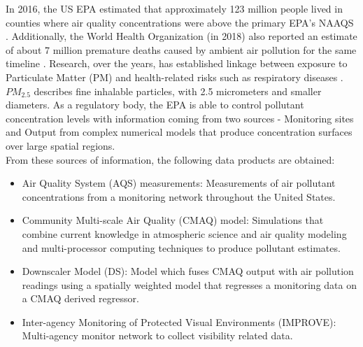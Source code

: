 \documentclass[10pt]{article}
\theoremstyle{plain}
\theoremstyle{definition}
\theoremstyle{remark}
\begin{document}
\justify
In 2016, the US EPA estimated that approximately 123 million people lived in 
counties where air quality concentrations were above the primary EPA's NAAQS \cite{EPAAir}.  Additionally, the World Health Organization (in 2018) also reported an estimate of about 7 million premature deaths caused by ambient air pollution for the same timeline \cite{WhoAir}.  Research, over the years, has established linkage between exposure to Particulate Matter (PM) and health-related risks such as respiratory diseases \cite{schwartz1996air, braga2001lag, dominici2006fine}.  $PM_{2.5}$ describes fine inhalable particles, with 2.5 micrometers and smaller diameters.  As a regulatory body, the EPA is able to control pollutant concentration levels with information coming from two sources - Monitoring sites and Output from complex numerical models that produce concentration surfaces over large spatial regions.\\
\vspace{-1.5em}
\justify
From these sources of information, the following data products are obtained:
\begin{itemize}
	\vspace{-0.5em}
	\item Air Quality System (AQS) measurements: Measurements of air pollutant concentrations from a monitoring network throughout the United States.
	\vspace{-0.5em}
	\item Community Multi-scale Air Quality (CMAQ) model: Simulations that combine current knowledge in atmospheric science and air quality modeling and multi-processor computing techniques to produce pollutant estimates.
	\vspace{-0.5em}
	\item Downscaler Model (DS): Model which fuses CMAQ output with air pollution readings using a spatially weighted model that regresses a monitoring data on a CMAQ derived regressor.
	\vspace{-0.5em}
	\item Inter-agency Monitoring of Protected Visual Environments (IMPROVE): Multi-agency monitor network to collect visibility related data.
\end{itemize}
\end{document}
